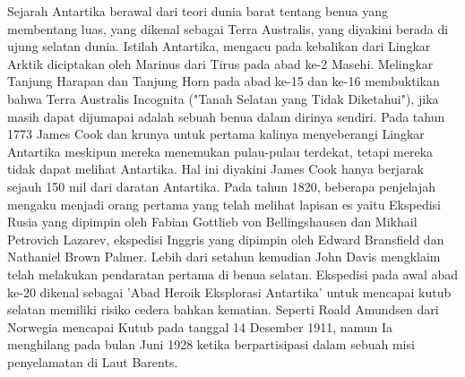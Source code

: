 Sejarah 
Antartika 
berawal
dari
teori
dunia 
barat 
tentang
benua
yang
membentang
luas, 
yang
dikenal
sebagai 
Terra Australis, 
yang 
diyakini 
berada
di ujung 
selatan
dunia.
Istilah
Antartika,
mengacu
pada
kebalikan
dari
Lingkar
Arktik
diciptakan
oleh
Marinus
dari
Tirus
pada
abad
ke-2
Masehi.
Melingkar
Tanjung
Harapan
dan
Tanjung 
Horn
pada
abad
ke-15
dan
ke-16 
membuktikan bahwa Terra Australis Incognita ("Tanah Selatan yang Tidak Diketahui"), jika masih dapat dijumapai adalah sebuah benua dalam dirinya sendiri. Pada tahun 1773 James Cook dan krunya untuk pertama kalinya menyeberangi Lingkar Antartika meskipun mereka menemukan pulau-pulau terdekat, tetapi mereka tidak dapat melihat Antartika. Hal ini diyakini James Cook hanya berjarak sejauh 150 mil dari daratan Antartika.
Pada tahun 1820, beberapa penjelajah mengaku menjadi orang pertama yang telah melihat lapisan es yaitu Ekspedisi Rusia yang dipimpin oleh Fabian Gottlieb von Bellingshausen dan Mikhail Petrovich Lazarev, ekspedisi Inggris yang dipimpin oleh Edward Bransfield dan Nathaniel Brown Palmer. Lebih dari setahun kemudian John Davis mengklaim telah melakukan pendaratan pertama di benua selatan.
Ekspedisi pada awal abad ke-20 dikenal sebagai 'Abad Heroik Eksplorasi Antartika' untuk mencapai kutub selatan memiliki risiko cedera bahkan kematian. Seperti Roald Amundsen dari Norwegia mencapai Kutub pada tanggal 14 Desember 1911, namun Ia menghilang pada bulan Juni 1928 ketika berpartisipasi dalam sebuah misi penyelamatan di Laut Barents.


